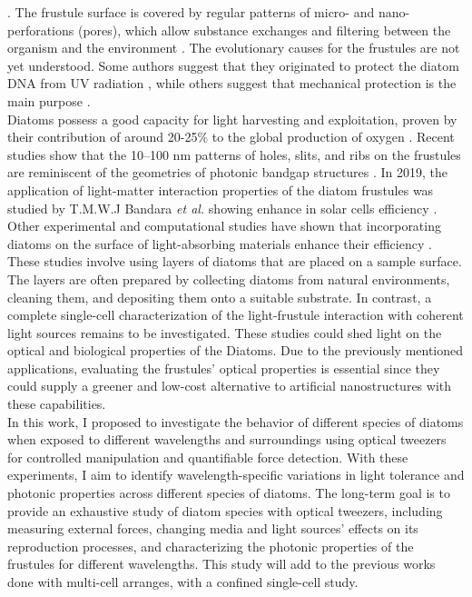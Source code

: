 \documentclass[letterpaper,12pt,oneside]{book}
\begin{document}
 \cite{aguirre2018diatomDNAViolet}. The frustule surface is covered by regular patterns of micro- and nano-perforations (pores), which allow substance exchanges and filtering between the organism and the environment \cite{de2021underwater}. The evolutionary causes for the frustules are
not yet understood. Some authors suggest that they originated to protect the diatom DNA from UV radiation \cite{aguirre2018diatomDNAViolet}, while others suggest that mechanical protection is the main purpose \cite{hamm2003architecture}.\\\indent
Diatoms possess a good capacity for light harvesting and exploitation, proven by their contribution of around 20-25$\%$ to the global production of oxygen \cite{carbonexport}. Recent studies show that the 10–100 nm patterns of holes, slits, and ribs on the frustules are
reminiscent of the geometries of photonic bandgap structures \cite{fuhrmann2004diatoms}. In 2019, the application of light-matter interaction properties of the diatom frustules was studied by T.M.W.J Bandara \textit{et al.} showing enhance in solar cells efficiency \cite{solardiatom}. Other experimental and computational studies have shown that incorporating diatoms on the surface of light-absorbing materials enhance their efficiency \cite{chen2015numerical}. These studies involve using layers of diatoms that are placed on a sample surface. The layers are often prepared by collecting diatoms from natural environments, cleaning them, and depositing them onto a suitable substrate. In contrast, a complete single-cell characterization of the light-frustule interaction with coherent light sources remains to be investigated. These studies could shed light on the optical and biological properties of the Diatoms. 
Due to the previously mentioned applications, evaluating the frustules' optical properties is essential since they could supply a greener and low-cost alternative to artificial nanostructures with these capabilities.  \\\indent 
In this work, I proposed to investigate the behavior of different species of diatoms when exposed to different wavelengths and surroundings using optical tweezers for controlled manipulation and quantifiable force detection. With these experiments, I aim to identify wavelength-specific variations in light tolerance and photonic properties across different species of diatoms. The long-term goal is to provide an exhaustive study of diatom species with optical tweezers,  including measuring external forces, changing media and light sources' effects on its reproduction processes,  and characterizing the photonic properties of the frustules for different wavelengths. This study will add to the previous works done with multi-cell arranges, with a confined single-cell study. %
\end{document}
